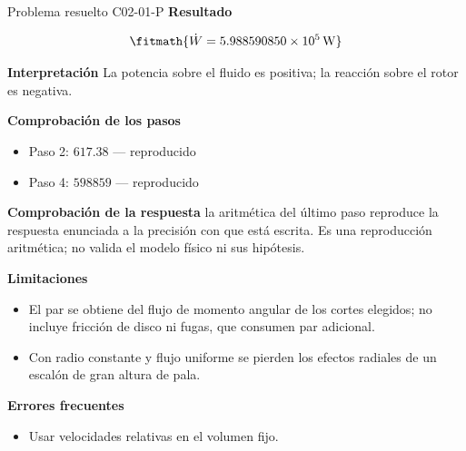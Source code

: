 \documentclass[10pt,openany]{book}
\begin{document}
\begin{studiumworked}{Problema resuelto C02-01-P}
\noindent\textbf{Resultado}

\[
\fitmath{\dot{W}=5.988590850\times10^{5}\,\mathrm{W}}
\]

\noindent\textbf{Interpretación}
La potencia sobre el fluido es positiva; la reacción sobre el rotor es negativa.

\noindent\textbf{Comprobación de los pasos}
\begin{itemize}
\item Paso 2: $617.38$ — reproducido
\item Paso 4: $598859$ — reproducido
\end{itemize}

\noindent\textbf{Comprobación de la respuesta} la aritmética del último paso reproduce la respuesta enunciada a la precisión con que está escrita. Es una reproducción aritmética; no valida el modelo físico ni sus hipótesis.

\noindent\textbf{Limitaciones}
\begin{itemize}
\item El par se obtiene del flujo de momento angular de los cortes elegidos; no incluye fricción de disco ni fugas, que consumen par adicional.
\item Con radio constante y flujo uniforme se pierden los efectos radiales de un escalón de gran altura de pala.
\end{itemize}

\noindent\textbf{Errores frecuentes}
\begin{itemize}
\item Usar velocidades relativas en el volumen fijo.
\end{itemize}
\end{studiumworked}
\end{document}
